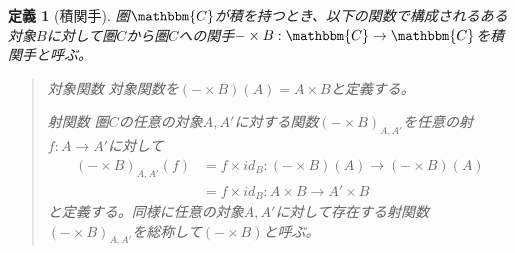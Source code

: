 \documentclass[uplatex,dvipdfmx]{jsarticle}
\newcommand{\cat}[1]{\mathbbm{#1}}
\newcommand{\arrow}{\rightarrow}
\newcommand{\functor}[3]{#1:\cat{#2}\arrow \cat{#3}}
\newcommand{\mor}[3]{#1:#2\arrow #3}
\newtheorem{define}[proof]{定義}
\numberwithin{proof}{subsection}
\newenvironment{mydescription}
{\begin{description}
  \setlength{\parskip}{0.5cm}
}
{\end{description}}
\begin{document}
	\begin{define}[積関手]
		圏$\cat{C}$が積を持つとき、以下の関数で構成されるある対象$B$に対して圏$C$から圏$C$への関手$\functor{-\times B}{C}{C}$を積関手と呼ぶ。
		\begin{quote}
			\begin{mydescription}
			\item[対象関数] 対象関数を$(-\times B)(A)=A\times B$と定義する。
			\item[射関数] 圏$C$の任意の対象$A,A'$に対する関数$(-\times B)_{A,A'}$を任意の射$\mor{f}{A}{A'}$に対して
			\begin{align*}
				(-\times B)_{A,A'}(f)&=\mor{f\times id_B}{(-\times B)(A)}{(-\times B)(A)}\\
				&=\mor{f\times id_B}{A\times B}{A'\times B}
			\end{align*}
			と定義する。同様に任意の対象$A,A'$に対して存在する射関数$(-\times B)_{A,A'}$を総称して$(-\times B)$と呼ぶ。
			\begin{center}
\end{center}
\end{mydescription}
\end{quote}
\end{define}
\end{document}
